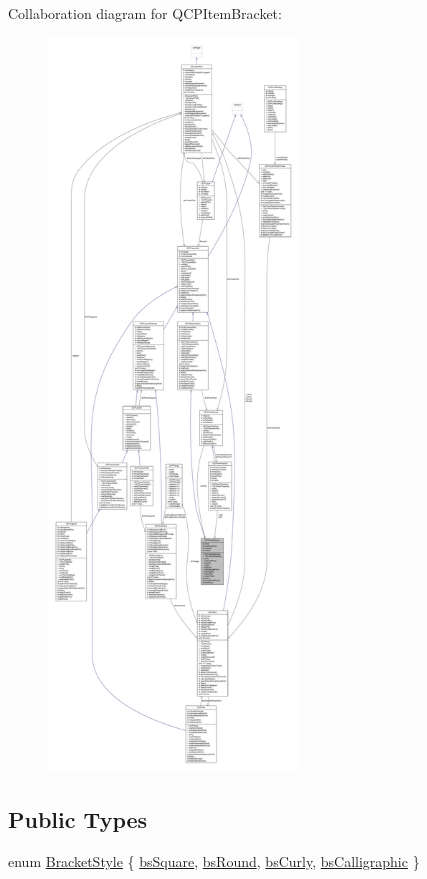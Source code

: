 Collaboration diagram for Q\+C\+P\+Item\+Bracket\+:\nopagebreak
\begin{figure}[H]
\begin{center}
\leavevmode
\includegraphics[height=550pt]{class_q_c_p_item_bracket__coll__graph}
\end{center}
\end{figure}
\subsection*{Public Types}
\begin{DoxyCompactItemize}
\item 
enum \hyperlink{class_q_c_p_item_bracket_a7ac3afd0b24a607054e7212047d59dbd}{Bracket\+Style} \{ \hyperlink{class_q_c_p_item_bracket_a7ac3afd0b24a607054e7212047d59dbda7f9df4a7359bfe3dac1dbe4ccf5d220c}{bs\+Square}, 
\hyperlink{class_q_c_p_item_bracket_a7ac3afd0b24a607054e7212047d59dbda394627b0830a26ee3e0a02ca67a9f918}{bs\+Round}, 
\hyperlink{class_q_c_p_item_bracket_a7ac3afd0b24a607054e7212047d59dbda5024ce4023c2d8de4221f1cd4816acd8}{bs\+Curly}, 
\hyperlink{class_q_c_p_item_bracket_a7ac3afd0b24a607054e7212047d59dbda8f29f5ef754e2dc9a9efdedb2face0f3}{bs\+Calligraphic}
 \}
\end{DoxyCompactItemize}
